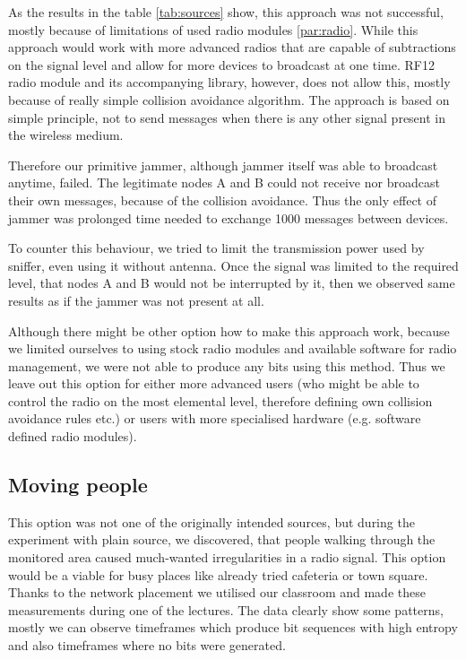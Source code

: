 \documentclass[
  print, %
  Table,   %
  nolof,     %
  nolot,     %
           oneside
]{fithesis3}
\begin{document}
  As the results in the table \ref{tab:sources} show, this approach was not successful, mostly because of limitations of used radio modules \ref{par:radio}. While this approach would work with more advanced radios that are capable of subtractions on the signal level and allow for more devices to broadcast at one time. RF12 radio module and its accompanying library, however, does not allow this, mostly because of really simple collision avoidance algorithm. The approach is based on simple principle, not to send messages when there is any other signal present in the wireless medium.

  Therefore our primitive jammer, although jammer itself was able to broadcast anytime, failed. The legitimate nodes A and B could not receive nor broadcast their own messages, because of the collision avoidance. Thus the only effect of jammer was prolonged time needed to exchange 1000 messages between devices.

  To counter this behaviour, we tried to limit the transmission power used by sniffer, even using it without antenna. Once the signal was limited to the required level, that nodes A and B would not be interrupted by it, then we observed same results as if the jammer was not present at all.

  Although there might be other option how to make this approach work, because we limited ourselves to using stock radio modules and available software for radio management, we were not able to produce any bits using this method.
  Thus we leave out this option for either more advanced users (who might be able to control the radio on the most elemental level, therefore defining own collision avoidance rules etc.) or users with more specialised hardware (e.g. software defined radio modules). %

  \subsection{Moving people}\label{src:people}
  This option was not one of the originally intended sources, but during the experiment with plain source, we discovered, that people walking through the monitored area caused much-wanted irregularities in a radio signal. This option would be a viable for busy places like already tried cafeteria \cite{Mathur2008Rssi} or town square. Thanks to the network placement we utilised our classroom and made these measurements during one of the lectures. The data clearly show some patterns, mostly we can observe timeframes which produce bit sequences with high entropy and also timeframes where no bits were generated.
\end{document}
